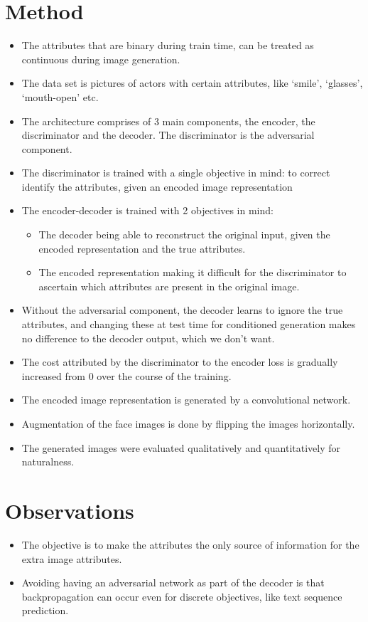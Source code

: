 \documentclass[12pt]{article}
\begin{document}
\section{Method}
  \begin{itemize}
    \item The attributes that are binary during train time, can be treated as continuous during image generation.
    \item The data set is pictures of actors with certain attributes, like `smile', `glasses', `mouth-open' etc.
    \item The architecture comprises of 3 main components, the encoder, the discriminator and the decoder. The discriminator is the adversarial component.
    \item The discriminator is trained with a single objective in mind: to correct identify the attributes, given an encoded image representation
    \item The encoder-decoder is trained with 2 objectives in mind:
    \begin{itemize}
      \item The decoder being able to reconstruct the original input, given the encoded representation and the true attributes.
      \item The encoded representation making it difficult for the discriminator to ascertain which attributes are present in the original image.
    \end{itemize}
    \item Without the adversarial component, the decoder learns to ignore the true attributes, and changing these at test time for conditioned generation makes no difference to the decoder output, which we don't want.
    \item The cost attributed by the discriminator to the encoder loss is gradually increased from 0 over the course of the training.
    \item The encoded image representation is generated by a convolutional network.
    \item Augmentation of the face images is done by flipping the images horizontally.
    \item The generated images were evaluated qualitatively and quantitatively for naturalness.      
  \end{itemize}

\section{Observations}
  \begin{itemize}
    \item The objective is to make the attributes the only source of information for the extra image attributes.
    \item Avoiding having an adversarial network as part of the decoder is that backpropagation can occur even for discrete objectives, like text sequence prediction.
  \end{itemize}
\end{document}
